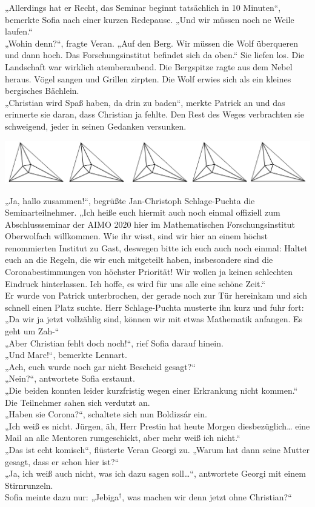 \documentclass[oneside]{memoir}
\newcommand{\parasep}{
\bigskip
\bigskip
\begin{center} 
   \includegraphics[scale=.08]{parasep5.jpg} 
\end{center}
\bigskip
\bigskip
}
\begin{document}
„Allerdings hat er Recht, das Seminar beginnt tatsächlich in 10 Minuten“, bemerkte Sofia nach einer kurzen Redepause. „Und wir müssen noch ne Weile laufen.“  \\
„Wohin denn?“, fragte Veran. „Auf den Berg. Wir müssen die Wolf überqueren und dann hoch. Das Forschungsinstitut befindet sich da oben.“ Sie liefen los. Die Landschaft war wirklich atemberaubend. Die Bergspitze ragte aus dem Nebel heraus. Vögel sangen und Grillen zirpten. Die Wolf erwies sich als ein kleines bergisches Bächlein.  \\
„Christian wird Spaß haben, da drin zu baden“, merkte Patrick an und das erinnerte sie daran, dass Christian ja fehlte. Den Rest des Weges verbrachten sie schweigend, jeder in seinen Gedanken versunken.

\parasep

\noindent „Ja, hallo zusammen!“, begrüßte Jan-Christoph Schlage-Puchta die Seminarteilnehmer. „Ich heiße euch hiermit auch noch einmal offiziell zum Abschlussseminar der AIMO 2020 hier im Mathematischen Forschungsinstitut Oberwolfach willkommen. Wie ihr wisst, sind wir hier an einem höchst renommierten Institut zu Gast, deswegen bitte ich euch auch noch einmal: Haltet euch an die Regeln, die wir euch mitgeteilt haben, insbesondere sind die Coronabestimmungen von höchster Priorität! Wir wollen ja keinen schlechten Eindruck hinterlassen. Ich hoffe, es wird für uns alle eine schöne Zeit.“ \\
Er wurde von Patrick unterbrochen, der gerade noch zur Tür hereinkam und sich schnell einen Platz suchte. Herr Schlage-Puchta musterte ihn kurz und fuhr fort: „Da wir ja jetzt vollzählig sind, können wir mit etwas Mathematik anfangen. Es geht um Zah-“ \\
„Aber Christian fehlt doch noch!“, rief Sofia darauf hinein. \\
„Und Marc!“, bemerkte Lennart. \\
„Ach, euch wurde noch gar nicht Bescheid gesagt?“ \\
„Nein?“, antwortete Sofia erstaunt. \\
„Die beiden konnten leider kurzfristig wegen einer Erkrankung nicht kommen.“ \\
Die Teilnehmer sahen sich verdutzt an. \\
„Haben sie Corona?“, schaltete sich nun Boldizsár ein. \\
„Ich weiß es nicht. Jürgen, äh, Herr Prestin hat heute Morgen diesbezüglich\ldots{} eine Mail an alle Mentoren rumgeschickt, aber mehr weiß ich nicht.“ \\
„Das ist echt komisch“, flüsterte Veran Georgi zu. „Warum hat dann seine Mutter gesagt, dass er schon hier ist?“ \\
„Ja, ich weiß auch nicht, was ich dazu sagen soll\ldots“, antwortete Georgi mit einem Stirnrunzeln. \\
Sofia meinte dazu nur: „Jebiga$^{\dagger}$, was machen wir denn jetzt ohne Christian?“
\end{document}
